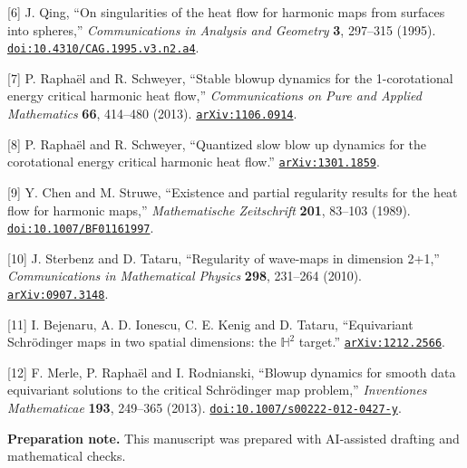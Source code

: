\documentclass[
  11pt,
  a4paper,
]{article}
\begin{document}
{[}6{]} J. Qing, ``On singularities of the heat flow for harmonic maps from surfaces into spheres,'' \emph{Communications in Analysis and Geometry} \textbf{3}, 297--315 (1995). \href{https://doi.org/10.4310/CAG.1995.v3.n2.a4}{\nolinkurl{doi:10.4310/CAG.1995.v3.n2.a4}}.

{[}7{]} P. Raphaël and R. Schweyer, ``Stable blowup dynamics for the 1-corotational energy critical harmonic heat flow,'' \emph{Communications on Pure and Applied Mathematics} \textbf{66}, 414--480 (2013). \href{https://arxiv.org/abs/1106.0914}{\nolinkurl{arXiv:1106.0914}}.

{[}8{]} P. Raphaël and R. Schweyer, ``Quantized slow blow up dynamics for the corotational energy critical harmonic heat flow.'' \href{https://arxiv.org/abs/1301.1859}{\nolinkurl{arXiv:1301.1859}}.

{[}9{]} Y. Chen and M. Struwe, ``Existence and partial regularity results for the heat flow for harmonic maps,'' \emph{Mathematische Zeitschrift} \textbf{201}, 83--103 (1989). \href{https://doi.org/10.1007/BF01161997}{\nolinkurl{doi:10.1007/BF01161997}}.

{[}10{]} J. Sterbenz and D. Tataru, ``Regularity of wave-maps in dimension 2+1,'' \emph{Communications in Mathematical Physics} \textbf{298}, 231--264 (2010). \href{https://arxiv.org/abs/0907.3148}{\nolinkurl{arXiv:0907.3148}}.

{[}11{]} I. Bejenaru, A. D. Ionescu, C. E. Kenig and D. Tataru, ``Equivariant Schrödinger maps in two spatial dimensions: the \(\mathbb H^2\) target.'' \href{https://arxiv.org/abs/1212.2566}{\nolinkurl{arXiv:1212.2566}}.

{[}12{]} F. Merle, P. Raphaël and I. Rodnianski, ``Blowup dynamics for smooth data equivariant solutions to the critical Schrödinger map problem,'' \emph{Inventiones Mathematicae} \textbf{193}, 249--365 (2013). \href{https://doi.org/10.1007/s00222-012-0427-y}{\nolinkurl{doi:10.1007/s00222-012-0427-y}}.

\textbf{Preparation note.} This manuscript was prepared with AI-assisted drafting and mathematical checks.
\end{document}
